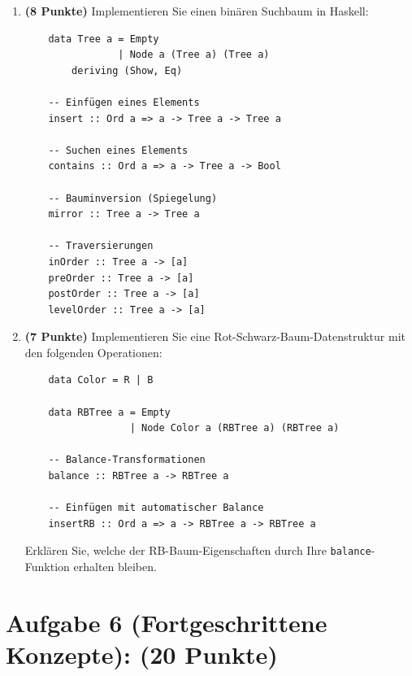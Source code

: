 \documentclass[12pt,a4paper]{article}
\makeatletter
\def\cleardoublepage{\clearpage\if@twoside\ifodd\c@page\else%
\hbox{}%
\thispagestyle{empty}%
\newpage%
\if@twocolumn\hbox{}\newpage\fi\fi\fi}
\makeatother
\begin{document}
\begin{enumerate}
    \item \textbf{(8 Punkte)} Implementieren Sie einen binären Suchbaum in Haskell:
    \begin{verbatim}
    data Tree a = Empty
                | Node a (Tree a) (Tree a)
        deriving (Show, Eq)
    
    -- Einfügen eines Elements
    insert :: Ord a => a -> Tree a -> Tree a
    
    -- Suchen eines Elements
    contains :: Ord a => a -> Tree a -> Bool
    
    -- Bauminversion (Spiegelung)
    mirror :: Tree a -> Tree a
    
    -- Traversierungen
    inOrder :: Tree a -> [a]
    preOrder :: Tree a -> [a]
    postOrder :: Tree a -> [a]
    levelOrder :: Tree a -> [a]
    \end{verbatim}
    
    \item \textbf{(7 Punkte)} Implementieren Sie eine Rot-Schwarz-Baum-Datenstruktur mit den folgenden Operationen:
    \begin{verbatim}
    data Color = R | B
    
    data RBTree a = Empty
                  | Node Color a (RBTree a) (RBTree a)
    
    -- Balance-Transformationen
    balance :: RBTree a -> RBTree a
    
    -- Einfügen mit automatischer Balance
    insertRB :: Ord a => a -> RBTree a -> RBTree a
    \end{verbatim}
    
    Erklären Sie, welche der RB-Baum-Eigenschaften durch Ihre \texttt{balance}-Funktion erhalten bleiben.
\end{enumerate}

\cleardoublepage

\section*{Aufgabe 6 (Fortgeschrittene Konzepte): (20 Punkte)}
\end{document}
